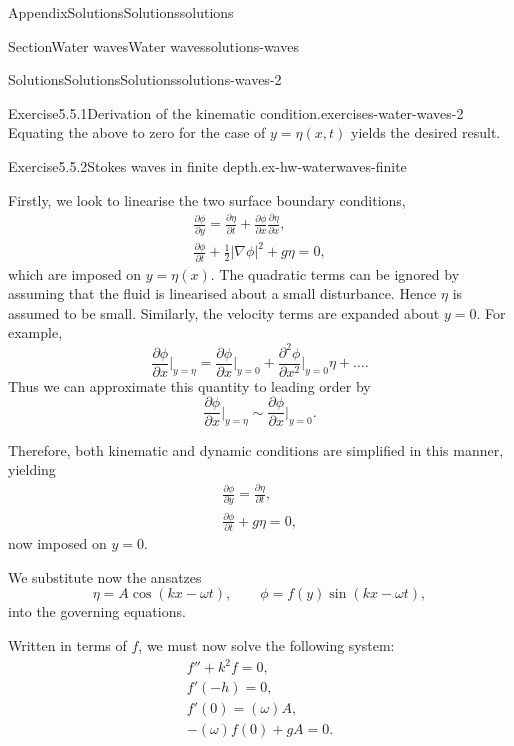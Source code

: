 \documentclass[oneside,10pt,]{book}
\numberwithin{equation}{section}
\newcommand{\pd}[2]{\frac{\partial#1}{\partial#2}}
\begin{document}
\begin{appendixptx}{Appendix}{Solutions}{}{Solutions}{}{}{solutions}
\begin{sectionptx}{Section}{Water waves}{}{Water waves}{}{}{solutions-waves}
\begin{solutions-subsection-numberless}{Solutions}{Solutions}{}{Solutions}{}{}{solutions-waves-2}
\begin{divisionsolution}{Exercise}{5.5.1}{Derivation of the kinematic condition.}{exercises-water-waves-2}
\begin{equation*}
\end{equation*}
Equating the above to zero for the case of \(y = \eta(x, t)\) yields the desired result.%
\end{divisionsolution}%
\begin{divisionsolution}{Exercise}{5.5.2}{Stokes waves in finite depth.}{ex-hw-waterwaves-finite}%
\par\smallskip%
\noindent\hypertarget{ex-hw-waterwaves-finite-3-main}{}Firstly, we look to linearise the two surface boundary conditions,%
\begin{gather*}
\pd{\phi}{y}= \pd{\eta}{t} + \pd{\phi}{x}\pd{\eta}{x},\\
\pd{\phi}{t} + \frac{1}{2}|\nabla \phi|^2 + g\eta = 0,
\end{gather*}
which are imposed on \(y = \eta(x)\). The quadratic terms can be ignored by assuming that the fluid is linearised about a small disturbance. Hence \(\eta\) is assumed to be small. Similarly, the velocity terms are expanded about \(y = 0\). For example,%
\begin{equation*}
\pd{\phi}{x}\biggr\rvert_{y = \eta} = \pd{\phi}{x}\biggr\rvert_{y = 0} + \pd{^2\phi}{x^2}\biggr\rvert_{y = 0}\eta + \ldots.
\end{equation*}
Thus we can approximate this quantity to leading order by%
\begin{equation*}
\pd{\phi}{x}\biggr\rvert_{y = \eta} \sim \pd{\phi}{x}\biggr\rvert_{y = 0}.
\end{equation*}
%
\par
Therefore, both kinematic and dynamic conditions are simplified in this manner, yielding%
\begin{gather*}
\pd{\phi}{y}= \pd{\eta}{t},\\
\pd{\phi}{t} + g\eta = 0,
\end{gather*}
now imposed on \(y = 0\).%
\par
We substitute now the ansatzes%
\begin{equation*}
\eta = A\cos(kx - \omega t), \qquad \phi = f(y)\sin(kx - \omega t),
\end{equation*}
into the governing equations.%
\par
Written in terms of \(f\), we must now solve the following system:%
\begin{gather*}
f'' + k^2 f = 0, \\
f'(-h) = 0, \\
f'(0) = (\omega)A, \\
-(\omega) f(0) + gA = 0. 
\end{gather*}

\end{divisionsolution}
\end{solutions-subsection-numberless}
\end{sectionptx}
\end{appendixptx}
\end{document}
